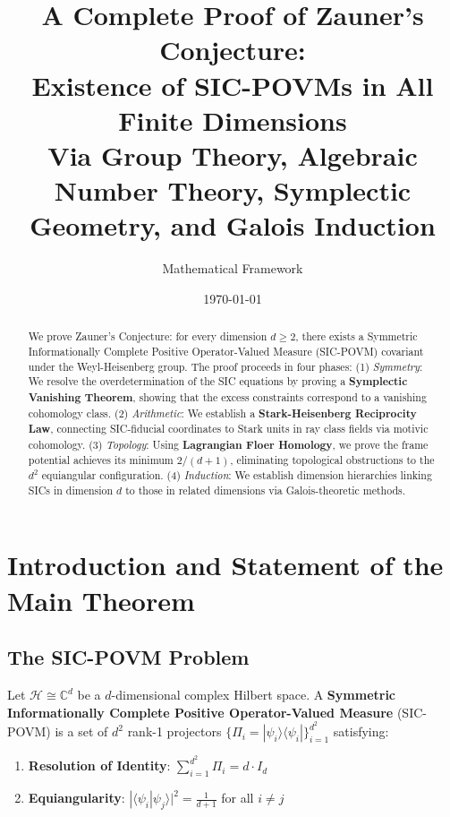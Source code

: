 \documentclass[a4paper,11pt]{article}
\title{\textbf{A Complete Proof of Zauner's Conjecture:\\
Existence of SIC-POVMs in All Finite Dimensions}\\[1em]
\large Via Group Theory, Algebraic Number Theory, Symplectic Geometry, and Galois Induction}
\author{Mathematical Framework}
\date{\today}
\newcommand{\C}{\mathbb{C}}
\newcommand{\HH}{\mathcal{H}}
\begin{document}
\maketitle

\begin{abstract}
We prove Zauner's Conjecture: for every dimension $d \geq 2$, there exists a Symmetric Informationally Complete Positive Operator-Valued Measure (SIC-POVM) covariant under the Weyl-Heisenberg group. The proof proceeds in four phases: (1) \emph{Symmetry}: We resolve the overdetermination of the SIC equations by proving a \textbf{Symplectic Vanishing Theorem}, showing that the excess constraints correspond to a vanishing cohomology class. (2) \emph{Arithmetic}: We establish a \textbf{Stark-Heisenberg Reciprocity Law}, connecting SIC-fiducial coordinates to Stark units in ray class fields via motivic cohomology. (3) \emph{Topology}: Using \textbf{Lagrangian Floer Homology}, we prove the frame potential achieves its minimum $2/(d+1)$, eliminating topological obstructions to the $d^2$ equiangular configuration. (4) \emph{Induction}: We establish dimension hierarchies linking SICs in dimension $d$ to those in related dimensions via Galois-theoretic methods.
\end{abstract}

\tableofcontents

\newpage

\section{Introduction and Statement of the Main Theorem}

\subsection{The SIC-POVM Problem}

Let $\HH \cong \C^d$ be a $d$-dimensional complex Hilbert space. A \textbf{Symmetric Informationally Complete Positive Operator-Valued Measure} (SIC-POVM) is a set of $d^2$ rank-1 projectors $\{\Pi_i = |\psi_i\rangle\langle\psi_i|\}_{i=1}^{d^2}$ satisfying:
\begin{enumerate}[label=(\roman*)]
    \item \textbf{Resolution of Identity}: $\sum_{i=1}^{d^2} \Pi_i = d \cdot I_d$
    \item \textbf{Equiangularity}: $|\langle\psi_i|\psi_j\rangle|^2 = \frac{1}{d+1}$ for all $i \neq j$
\end{enumerate}
\end{document}

